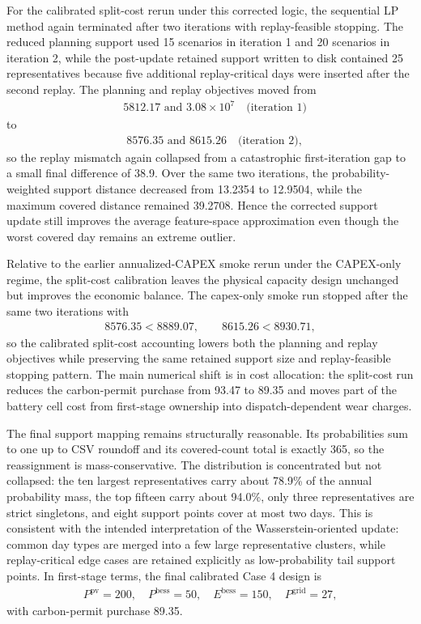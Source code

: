 For the calibrated split-cost rerun under this corrected logic, the sequential LP method again terminated after two iterations with replay-feasible stopping. The reduced planning support used 15 scenarios in iteration 1 and 20 scenarios in iteration 2, while the post-update retained support written to disk contained 25 representatives because five additional replay-critical days were inserted after the second replay. The planning and replay objectives moved from
\begin{align}
&5812.17 \text{ and } 3.08\times 10^7 \quad \text{(iteration 1)}
\end{align}
to
\begin{align}
&8576.35 \text{ and } 8615.26 \quad \text{(iteration 2)},
\end{align}
so the replay mismatch again collapsed from a catastrophic first-iteration gap to a small final difference of 38.9. Over the same two iterations, the probability-weighted support distance decreased from 13.2354 to 12.9504, while the maximum covered distance remained 39.2708. Hence the corrected support update still improves the average feature-space approximation even though the worst covered day remains an extreme outlier.

Relative to the earlier annualized-CAPEX smoke rerun under the CAPEX-only regime, the split-cost calibration leaves the physical capacity design unchanged but improves the economic balance. The capex-only smoke run stopped after the same two iterations with
\begin{align}
8576.35 < 8889.07,\qquad 8615.26 < 8930.71,
\end{align}
so the calibrated split-cost accounting lowers both the planning and replay objectives while preserving the same retained support size and replay-feasible stopping pattern. The main numerical shift is in cost allocation: the split-cost run reduces the carbon-permit purchase from 93.47 to 89.35 and moves part of the battery cell cost from first-stage ownership into dispatch-dependent wear charges.

The final support mapping remains structurally reasonable. Its probabilities sum to one up to CSV roundoff and its covered-count total is exactly 365, so the reassignment is mass-conservative. The distribution is concentrated but not collapsed: the ten largest representatives carry about 78.9\% of the annual probability mass, the top fifteen carry about 94.0\%, only three representatives are strict singletons, and eight support points cover at most two days. This is consistent with the intended interpretation of the Wasserstein-oriented update: common day types are merged into a few large representative clusters, while replay-critical edge cases are retained explicitly as low-probability tail support points. In first-stage terms, the final calibrated Case 4 design is
\begin{align}
P^{\mathrm{pv}}=200,\quad P^{\mathrm{bess}}=50,\quad E^{\mathrm{bess}}=150,\quad P^{\mathrm{grid}}=27,
\end{align}
with carbon-permit purchase 89.35.

